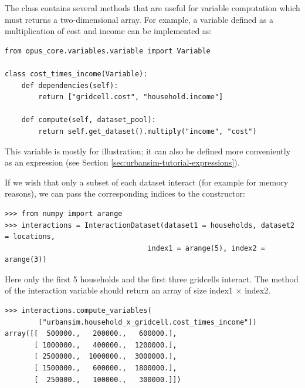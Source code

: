 The  class contains several methods that are useful for
variable \variablesindex computation which must returns a two-dimensional array. For example, a
variable \variablesindex defined as a multiplication of cost and income can be implemented as:
\variablesindex
\begin{verbatim}
from opus_core.variables.variable import Variable

class cost_times_income(Variable):
    def dependencies(self):
        return ["gridcell.cost", "household.income"]

    def compute(self, dataset_pool):
        return self.get_dataset().multiply("income", "cost")
\end{verbatim}

This  variable is mostly for illustration; it can
also be defined more conveniently as an expression (see Section
\ref{sec:urbansim-tutorial-expressions}).

If we wish that only a subset of each dataset \datasetindex interact (for example for
memory reasons), we can pass the corresponding indices to the constructor:
\begin{verbatim}
>>> from numpy import arange
>>> interactions = InteractionDataset(dataset1 = households, dataset2 = locations,
                                  index1 = arange(5), index2 = arange(3))
\end{verbatim}
Here only the first 5 households and the first three gridcells interact.
The  method of the interaction variable \variablesindex should return an array of
size index1 $\times$ index2.

\label{page:compute-interaction}
\variablesindex \attributesindex
\begin{verbatim}
>>> interactions.compute_variables(
        ["urbansim.household_x_gridcell.cost_times_income"])
array([[  500000.,   200000.,   600000.],
       [ 1000000.,   400000.,  1200000.],
       [ 2500000.,  1000000.,  3000000.],
       [ 1500000.,   600000.,  1800000.],
       [  250000.,   100000.,   300000.]])
\end{verbatim}

